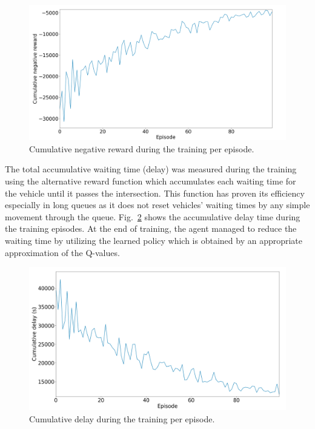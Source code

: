 \documentclass[conference]{IEEEtran}
\begin{document}
\begin{figure}[!ht]
    \centering
    \begin{center}
    \includegraphics[scale=0.23]{images/train_reward.png}
    \end{center}
    \caption{Cumulative negative reward during the training per episode.}
    \label{fig:10}
\end{figure}

The total accumulative waiting time (delay) was measured during the training using the alternative reward function which accumulates each waiting time for the vehicle until it passes the intersection. This function has proven its efficiency especially in long queues as it does not reset vehicles' waiting times by any simple movement through the queue. Fig.~\ref{fig:11} shows the accumulative delay time during the training episodes. At the end of training, the agent managed to reduce the waiting time by utilizing the learned policy which is obtained by an appropriate approximation of the Q-values. 

\begin{figure}[!ht]
    \centering
    \begin{center}
    \includegraphics[scale=0.24]{images/train_delay.png}
    \end{center}
    \caption{Cumulative delay during the training per episode.}
    \label{fig:11}
\end{figure}
\end{document}
